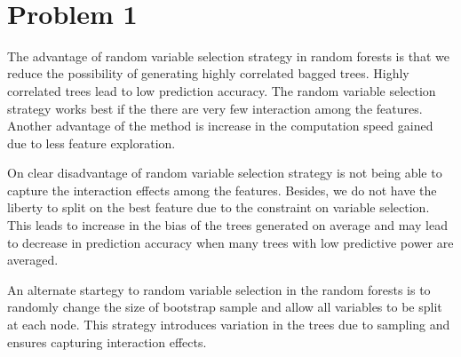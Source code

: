 \documentclass[11pt]{article}
\begin{document}
\begin{center}

\ \\
\end{center}

\section*{Problem 1}

\vspace{5 mm}
\noindent
The advantage of random variable selection strategy in random forests is that
we reduce the possibility of generating highly correlated bagged trees. Highly
correlated trees lead to low prediction accuracy. The random variable selection 
strategy works best if the there are very few interaction among the features. Another
advantage of the method is increase in the computation speed gained due to
less feature exploration. 

On clear disadvantage of random variable selection strategy is not being able to 
capture the interaction effects among the features. Besides, we do not have the
liberty to split on the best feature due to the constraint on variable selection. This 
leads to increase in the bias of the trees generated on average and may lead to
decrease in prediction accuracy when many trees with low predictive power are 
averaged.

An alternate startegy to random variable selection in the random forests is to 
randomly change the size of bootstrap sample and allow all variables to be split at 
each node. This strategy introduces variation in the trees due to sampling and 
ensures capturing interaction effects. 


\vspace{5 mm}
\noindent
\end{document}
